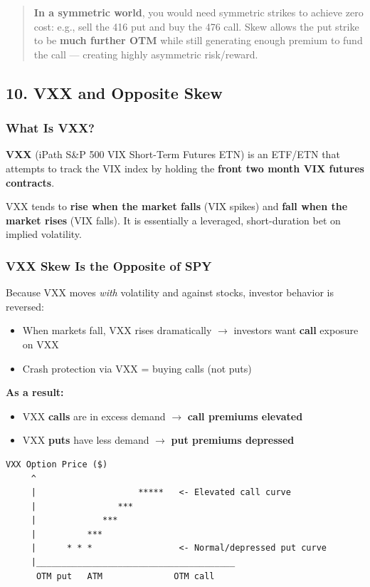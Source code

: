 \documentclass[12pt,openany]{book}
\begin{document}
\begin{quote}
\textbf{In a symmetric world}, you would need symmetric strikes to achieve zero cost: e.g., sell the 416 put and buy the 476 call. Skew allows the put strike to be \textbf{much further OTM} while still generating enough premium to fund the call — creating highly asymmetric risk/reward.
\end{quote}

\subsection{10. VXX and Opposite Skew}

\subsubsection{What Is VXX?}

\textbf{VXX} (iPath S\&P 500 VIX Short-Term Futures ETN) is an ETF/ETN that attempts to track the VIX index by holding the \textbf{front two month VIX futures contracts}.

VXX tends to \textbf{rise when the market falls} (VIX spikes) and \textbf{fall when the market rises} (VIX falls). It is essentially a leveraged, short-duration bet on implied volatility.

\subsubsection{VXX Skew Is the Opposite of SPY}

Because VXX moves \emph{with} volatility and against stocks, investor behavior is reversed:
\begin{itemize}[leftmargin=*]
    \item When markets fall, VXX rises dramatically \(\rightarrow\) investors want \textbf{call} exposure on VXX
    \item Crash protection via VXX = buying calls (not puts)
\end{itemize}

\textbf{As a result:}
\begin{itemize}[leftmargin=*]
    \item VXX \textbf{calls} are in excess demand \(\rightarrow\) \textbf{call premiums elevated}
    \item VXX \textbf{puts} have less demand \(\rightarrow\) \textbf{put premiums depressed}
\end{itemize}

\begin{center}
\begin{Verbatim}[fontsize=\small,breaklines=true]
VXX Option Price ($)
     ^
     |                    *****   <- Elevated call curve
     |                ***
     |             ***
     |          ***
     |      * * *                 <- Normal/depressed put curve
     |_______________________________________
      OTM put   ATM              OTM call
\end{Verbatim}
\end{center}
\end{document}
